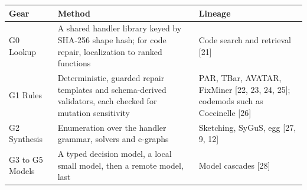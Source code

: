 \documentclass[10pt,letterpaper]{article}
\newcounter{none}
\begin{document}
{\def\LTcaptype{none} %
{\footnotesize\setlength{\tabcolsep}{3.8pt}\renewcommand{\arraystretch}{1.15}
\begin{longtable}[]{@{}
  >{\raggedright\arraybackslash}p{}
  >{\raggedright\arraybackslash}p{}
  >{\raggedright\arraybackslash}p{}@{}}
\toprule\noalign{}
\begin{minipage}[b]{\linewidth}\raggedright
\textbf{Gear}
\end{minipage} & \begin{minipage}[b]{\linewidth}\raggedright
\textbf{Method}
\end{minipage} & \begin{minipage}[b]{\linewidth}\raggedright
\textbf{Lineage}
\end{minipage} \\
\midrule\noalign{}
\endhead
\bottomrule\noalign{}
\endlastfoot
G0 Lookup & A shared handler library keyed by SHA-256 shape hash; for
code repair, localization to ranked functions & Code search and
retrieval {[}21{]} \\
G1 Rules & Deterministic, guarded repair templates and schema-derived
validators, each checked for mutation sensitivity & PAR, TBar, AVATAR,
FixMiner {[}22, 23, 24, 25{]}; codemods such as Coccinelle {[}26{]} \\
G2 Synthesis & Enumeration over the handler grammar, solvers and
e-graphs & Sketching, SyGuS, egg {[}27, 9, 12{]} \\
G3 to G5 Models & A typed decision model, a local small model, then a
remote model, last & Model cascades {[}28{]} \\
\end{longtable}
}
}
\end{document}
